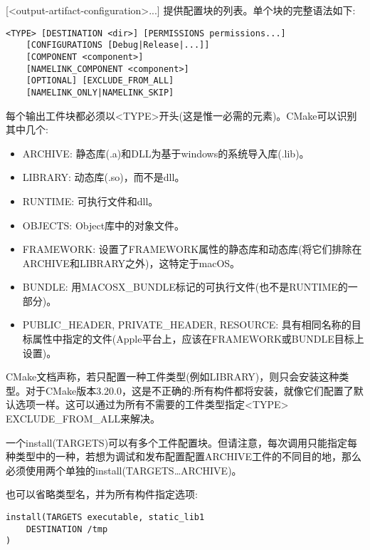 [<output-artifact-configuration>...] 提供配置块的列表。单个块的完整语法如下:

\begin{lstlisting}[style=styleCMake]
<TYPE> [DESTINATION <dir>] [PERMISSIONS permissions...]
	[CONFIGURATIONS [Debug|Release|...]]
	[COMPONENT <component>]
	[NAMELINK_COMPONENT <component>]
	[OPTIONAL] [EXCLUDE_FROM_ALL]
	[NAMELINK_ONLY|NAMELINK_SKIP]
\end{lstlisting}

每个输出工件块都必须以<TYPE>开头(这是惟一必需的元素)。CMake可以识别其中几个:

\begin{itemize}
\item 
ARCHIVE: 静态库(.a)和DLL为基于windows的系统导入库(.lib)。

\item 
LIBRARY: 动态库(.so)，而不是dll。

\item 
RUNTIME: 可执行文件和dll。

\item 
OBJECTS: Object库中的对象文件。

\item 
FRAMEWORK: 设置了FRAMEWORK属性的静态库和动态库(将它们排除在ARCHIVE和LIBRARY之外)，这特定于macOS。

\item 
BUNDLE: 用MACOSX\_BUNDLE标记的可执行文件(也不是RUNTIME的一部分)。

\item 
PUBLIC\_HEADER, PRIVATE\_HEADER, RESOURCE: 具有相同名称的目标属性中指定的文件(Apple平台上，应该在FRAMEWORK或BUNDLE目标上设置)。
\end{itemize}

CMake文档声称，若只配置一种工件类型(例如LIBRARY)，则只会安装这种类型。对于CMake版本3.20.0，这是不正确的:所有构件都将安装，就像它们配置了默认选项一样。这可以通过为所有不需要的工件类型指定<TYPE> EXCLUDE\_FROM\_ALL来解决。

\begin{tcolorbox}[colback=blue!5!white,colframe=blue!75!black,title=Note]
一个install(TARGETS)可以有多个工件配置块。但请注意，每次调用只能指定每种类型中的一种，若想为调试和发布配置配置ARCHIVE工件的不同目的地，那么必须使用两个单独的install(TARGETS…ARCHIVE)。
\end{tcolorbox}

也可以省略类型名，并为所有构件指定选项:

\begin{lstlisting}[style=styleCMake]
install(TARGETS executable, static_lib1
	DESTINATION /tmp
)
\end{lstlisting}

